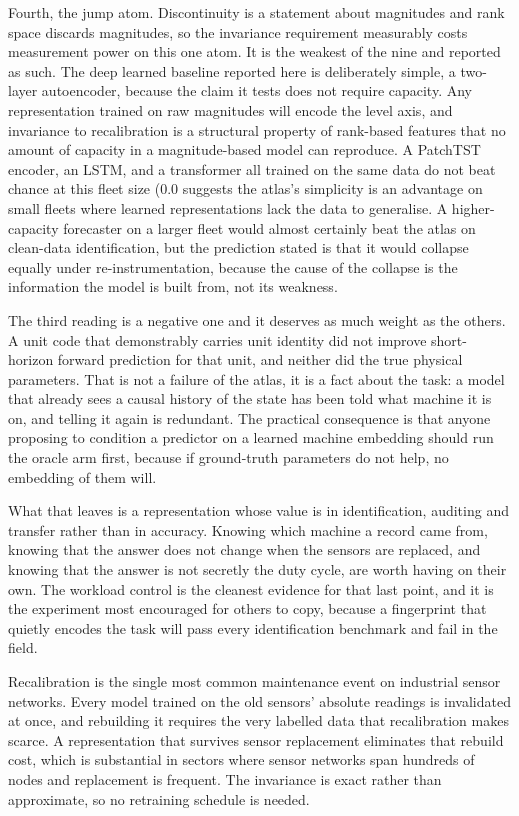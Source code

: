 \documentclass[11pt]{article}
\begin{document}
Fourth, the jump atom. Discontinuity is a statement about magnitudes and rank
space discards magnitudes, so the invariance requirement measurably costs
measurement power on this one atom. It is the weakest of the nine and
reported as such. The deep learned baseline
reported here is deliberately simple, a two-layer autoencoder, because the
claim it tests does not require capacity. Any representation trained on raw
magnitudes will encode the level axis, and invariance to recalibration is a
structural property of rank-based features that no amount of capacity in a
magnitude-based model can reproduce. A PatchTST encoder, an LSTM, and a
transformer all trained on the same data do not beat chance at this fleet
size (0.0%
suggests the atlas's simplicity is an advantage on small fleets where learned
representations lack the data to generalise. A higher-capacity forecaster on
a larger fleet would almost certainly beat the atlas on clean-data
identification, but the prediction stated is that it would collapse
equally under re-instrumentation, because the cause of the collapse is the
information the model is built from, not its weakness.

The third reading is a negative one and it deserves as much weight as the
others. A unit code that demonstrably carries unit identity did not improve
short-horizon forward prediction for that unit, and neither did the true
physical parameters. That is not a failure of the atlas, it is a fact about
the task: a model that already sees a causal history of the state has been
told what machine it is on, and telling it again is redundant. The practical
consequence is that anyone proposing to condition a predictor on a learned
machine embedding should run the oracle arm first, because if ground-truth
parameters do not help, no embedding of them will.

What that leaves is a representation whose value is in identification, auditing
and transfer rather than in accuracy. Knowing which machine a record came from,
knowing that the answer does not change when the sensors are replaced, and
knowing that the answer is not secretly the duty cycle, are worth having on
their own. The workload control is the cleanest evidence for that last point,
and it is the experiment most encouraged for others to copy, because a
fingerprint that quietly encodes the task will pass every identification
benchmark and fail in the field.

Recalibration is the single most common maintenance event on industrial
sensor networks. Every model trained on the old sensors' absolute readings is
invalidated at once, and rebuilding it requires the very labelled data that
recalibration makes scarce. A representation that survives sensor replacement
eliminates that rebuild cost, which is substantial in sectors where sensor
networks span hundreds of nodes and replacement is frequent. The invariance is
exact rather than approximate, so no retraining schedule is needed.
\end{document}
